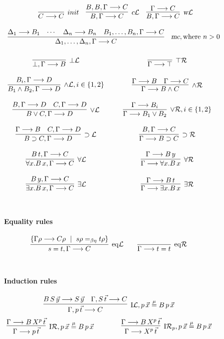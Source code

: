 \documentclass[preprint]{elsarticle}
\newcommand{\Seq}[2]{#1\longrightarrow #2}
\newcommand{\botL}{\bot{\cal L}}
\newcommand{\cL}{\hbox{\sl c}{\cal L}}
\newcommand{\defmu}{\stackrel{\mu}{=}}
\newcommand{\eqL}{{\rm eq}{\cal L}}
\newcommand{\eqR}{{\rm eq}{\cal R}}
\newcommand{\existsL}{\exists{\cal L}}
\newcommand{\existsR}{\exists{\cal R}}
\newcommand{\forallL}{\forall{\cal L}}
\newcommand{\forallR}{\forall{\cal R}}
\newcommand{\indR}{{\rm I}{\cal R}}
\newcommand{\indRP}{{\rm I}{\cal R}_p}
\newcommand{\indL}{{\rm I}{\cal L}}
\newcommand{\landL}{\land{\cal L}}
\newcommand{\landR}{\land{\cal R}}
\newcommand{\lorL}{\lor{\cal L}}
\newcommand{\lorR}{\lor{\cal R}}
\newcommand{\mc}{\hbox{\sl mc}}
\newcommand{\oimpL}{\oimp{\cal L}}
\newcommand{\oimpR}{\oimp{\cal R}}
\newcommand{\oimp}{\supset}
\newcommand{\topR}{\top{\cal R}}
\newcommand{\wL}{\hbox{\sl w}{\cal L}}
\begin{document}
\begin{figure}
$$
\begin{array}{cc}
  \multicolumn{2}{c}{
    \infer[init]{\Seq{C}{C}}{} 
    \quad
    \infer[\cL]{\Seq{B,\Gamma}{C}}
    {\Seq{B,B,\Gamma}{C}}
    \quad
    \infer[\wL]{\Seq{B,\Gamma}{C}}{\Seq{\Gamma}{C}}
  }
  \\ \\
  \multicolumn{2}{c}{       
    \infer[\begin{array}{l}
      \mc, 
      \mbox{where } n > 0 
    \end{array}]
    {\Seq{\Delta_1,\dots,\Delta_n, \Gamma}{C}}
    {\Seq{\Delta_1}{B_1}
      & \cdots &
      \Seq{\Delta_n}{B_n} &
      \Seq{B_1,\dots,B_n, \Gamma}{C}}}        
  \\ \\
  \infer[\botL]{\Seq{\bot,\Gamma}{B}}{\rule{0pt}{6pt}}
  & \infer[\topR]{\Seq{\Gamma}{\top}}{}
  \\ \\
  \infer[\landL, i \in \{1,2\}]{\Seq{B_1 \land B_2,\Gamma}{D}}
  {\Seq{B_i,\Gamma}{D}}
  & 
  \infer[\landR]{\Seq{\Gamma}{B \land C}}
  {\Seq{\Gamma}{B}
    & \Seq{\Gamma}{C}}
  \\ \\
  \infer[\lorL]{\Seq{B \lor C,\Gamma}{D}}
  {\Seq{B,\Gamma}{D}
    & \Seq{C,\Gamma}{D}}
  & 
  \infer[\lorR, i \in \{1,2\}]{\Seq{\Gamma}{B_1 \lor B_2}}
  {\Seq{\Gamma}{B_i}}
  \\ \\
  \infer[\oimpL]{\Seq{B \oimp C,\Gamma}{D}}
  {\Seq{\Gamma}{B}
    & \Seq{C,\Gamma}{D}}
  & \infer[\oimpR]{\Seq{\Gamma}{B \oimp C}}
  {\Seq{B,\Gamma}{C}}
  \\ \\
  \infer[\forallL]{\Seq{\forall x.B\,x,\Gamma}{C}}
  {\Seq{B\,t,\Gamma}{C}}
  & \infer[\forallR]{\Seq{\Gamma}{\forall x.B\,x}}
  {\Seq{\Gamma}{B\,y}}
  \\ \\
  \infer[\existsL]{\Seq{\exists x.B\,x,\Gamma}{C}}
  {\Seq{B\,y,\Gamma}{C}}
  & 
  \infer[\existsR]{\Seq{\Gamma}{\exists x.B\,x}}
  {\Seq{\Gamma}{B\,t}}
\end{array}
$$
\dotfill\\\paragraph{Equality rules}
$$
\infer[\eqL] {\Seq{s = t, \Gamma}{C}} {
  \{\Seq{\Gamma\rho}{C\rho}~\mid~s\rho =_{\beta\eta} t\rho \} } \qquad
\infer[\eqR] {\Seq{\Gamma}{t = t}} {}
$$
\dotfill\\\paragraph{Induction rules}
$$
\infer[\indL, p\,\vec x \defmu B\,p\,\vec x] {\Seq{\Gamma,
    p\,\vec{t}}{C}} {\Seq{B\,S \, \vec{y}}{S\,\vec{y}} & \Seq{\Gamma,
    S\,\vec{t}}{C} }
$$
$$
\infer[\indR, p\,\vec x \defmu B\,p\,\vec x]
{\Seq{\Gamma}{p\,\vec{t}}} {\Seq{\Gamma}{B\,X^p\,\vec{t}}}
\qquad\qquad \infer[\indRP, p\,\vec x \defmu B\,p\,\vec x]
{\Seq{\Gamma}{X^p\,\vec{t}}} {\Seq{\Gamma}{B\,X^p\,\vec{t}}}
$$
\dotfill\\[1em]

\end{figure}
\end{document}
